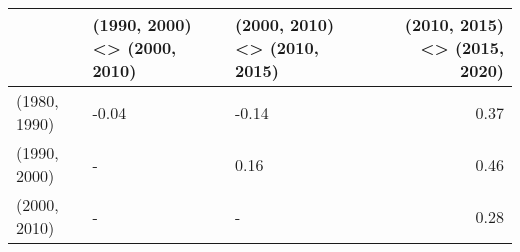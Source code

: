 \begin{tabular}{lllr}
\toprule
 & (1990, 2000) <> (2000, 2010) & (2000, 2010) <> (2010, 2015) & (2010, 2015) <> (2015, 2020) \\
\midrule
(1980, 1990) & -0.04 & -0.14 & 0.37 \\
(1990, 2000) & - & {\space }0.16 & 0.46 \\
(2000, 2010) & - & - & 0.28 \\
\bottomrule
\end{tabular}
